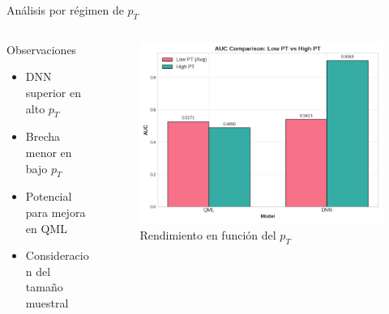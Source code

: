 \documentclass[aspectratio=169]{beamer}
\begin{document}
\begin{frame}{Análisis por régimen de \texorpdfstring{$p_T$}{pT}}
  \begin{columns}
    \begin{column}{0.45\textwidth}
      \begin{alertblock}{Observaciones}
        \begin{itemize}
          \item DNN superior en alto \texorpdfstring{$p_T$}{pT}
          \item Brecha menor en bajo \texorpdfstring{$p_T$}{pT}
          \item Potencial para mejora en QML
          \item Consideracion del tamaño muestral
        \end{itemize}
      \end{alertblock}
    \end{column}
    \begin{column}{0.53\textwidth}
      \begin{figure}
        \includegraphics[width=\textwidth]{resumen_hmmm/auc_low_vs_high_pt.png}
        \caption{\footnotesize Rendimiento en función del \texorpdfstring{$p_T$}{pT}}
      \end{figure}
    \end{column}
  \end{columns}
\end{frame}
\end{document}
